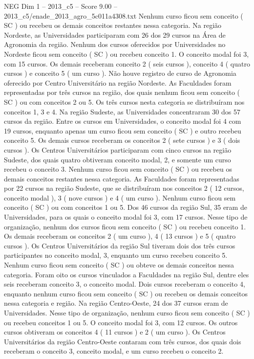 \begin{textsample}{NEG Dim 1 – 2013\_c5 – Score 9.00 – 2013\_c5/enade\_2013\_agro\_5c011a4308.txt}
Nenhum curso ficou sem conceito ( SC ) ou recebeu os demais conceitos restantes nessa categoria.
Na região Nordeste, as Universidades participaram com 26 dos 29 cursos na Área de Agronomia da região.
Nenhum dos cursos oferecidos por Universidades no Nordeste ficou sem conceito ( SC ) ou recebeu conceito 1.
O conceito modal foi 3, com 15 cursos.
Os demais receberam conceito 2 ( seis cursos ), conceito 4 ( quatro cursos ) e conceito 5 ( um curso ).
Não houve registro de curso de Agronomia oferecido por Centro Universitário na região Nordeste.
As Faculdades foram representadas por três cursos na região, dos quais nenhum ficou sem conceito ( SC ) ou com conceitos 2 ou 5.
Os três cursos nesta categoria se distribuíram nos conceitos 1, 3 e 4.
Na região Sudeste, as Universidades concentraram 30 dos 57 cursos da região.
Entre os cursos em Universidades, o conceito modal foi 4 com 19 cursos, enquanto apenas um curso ficou sem conceito ( SC ) e outro recebeu conceito 5.
Os demais cursos receberam os conceitos 2 ( sete cursos ) e 3 ( dois cursos ).
Os Centros Universitários participaram com cinco cursos na região Sudeste, dos quais quatro obtiveram conceito modal, 2, e somente um curso recebeu o conceito 3.
Nenhum curso ficou sem conceito ( SC ) ou recebeu os demais conceitos restantes nessa categoria.
As Faculdades foram representadas por 22 cursos na região Sudeste, que se distribuíram nos conceitos 2 ( 12 cursos, conceito modal ), 3 ( nove cursos ) e 4 ( um curso ).
Nenhum curso ficou sem conceito ( SC ) ou com conceitos 1 ou 5.
Dos 46 cursos da região Sul, 35 eram de Universidades, para os quais o conceito modal foi 3, com 17 cursos.
Nesse tipo de organização, nenhum dos cursos ficou sem conceito ( SC ) ou recebeu conceito 1.
Os demais receberam os conceitos 2 ( um curso ), 4 ( 13 cursos ) e 5 ( quatro cursos ).
Os Centros Universitários da região Sul tiveram dois dos três cursos participantes no conceito modal, 3, enquanto um curso recebeu conceito 5.
Nenhum curso ficou sem conceito ( SC ) ou obteve os demais conceitos nessa categoria.
Foram oito os cursos vinculados a Faculdades na região Sul, dentre eles seis receberam conceito 3, o conceito modal.
Dois cursos receberam o conceito 4, enquanto nenhum curso ficou sem conceito ( SC ) ou recebeu os demais conceitos nessa categoria e região.
Na região Centro-Oeste, 24 dos 37 cursos eram de Universidades.
Nesse tipo de organização, nenhum curso ficou sem conceito ( SC ) ou recebeu conceitos 1 ou 5.
O conceito modal foi 3, com 12 cursos.
Os outros cursos obtiveram os conceitos 4 ( 11 cursos ) e 2 ( um curso ).
Os Centros Universitários da região Centro-Oeste contaram com três cursos, dos quais dois receberam o conceito 3, conceito modal, e um curso recebeu o conceito 2.

\end{textsample}
